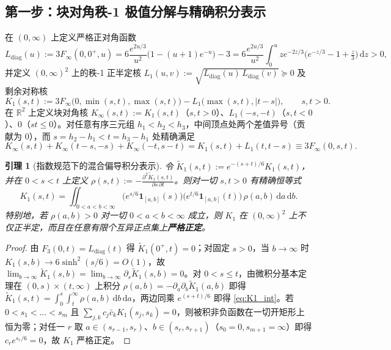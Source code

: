 \documentclass[11pt,a4paper]{article}
\newtheorem{lemma}[theorem]{引理}
\theoremstyle{remark}
\begin{document}
\subsection{第一步：块对角秩-1 极值分解与精确积分表示}

在 $(0,\infty)$ 上定义严格正对角函数
\[
L_{\mathrm{diag}}(u) := 3F_\infty(0, 0^+, u) = 6\frac{e^{2u/3}}{u^2}\big(1 - (u+1)e^{-u}\big) - 3 = 6\frac{e^{2u/3}}{u^2}\int_0^u z e^{-2z/3}\big(e^{-z/3} - 1 + \tfrac{z}{3}\big)\,\mathrm{d}z > 0,
\]
并定义 $(0,\infty)^2$ 上的秩-1 正半定核 $L_1(u,v) := \sqrt{L_{\mathrm{diag}}(u)\,L_{\mathrm{diag}}(v)} \succeq 0$ 及剩余对称核
\[
K_1(s,t) := 3F_\infty\big(0, \min(s,t), \max(s,t)\big) - L_1\big(\max(s,t), |t-s|\big), \qquad s, t > 0.
\]
在 $\mathbb{R}^2$ 上定义块对角核 $K_\infty(s,t) := K_1(s,t)$（$s,t>0$）、$L_1(-s,-t)$（$s,t<0$）、$0$（$st\le 0$）。对任意有序三元组 $h_1 < h_2 < h_3$，中间顶点处两个差值异号（贡献为 $0$），而 $s = h_2-h_1 < t = h_3-h_1$ 处精确满足
\[
K_\infty(s,t) + K_\infty(t-s,-s) + K_\infty(-t,s-t) = K_1(s,t) + L_1(t, t-s) \equiv 3F_\infty(0, s, t).
\]

\begin{lemma}[指数规范下的混合偏导积分表示]\label{lem:rho_int}
令 $\tilde{K}_1(s,t) := e^{-(s+t)/6} K_1(s,t)$，并在 $0 < s < t$ 上定义 $\rho(s,t) := -\frac{\partial^2 \tilde{K}_1(s,t)}{\partial s\,\partial t}$。则对一切 $s, t > 0$ 有精确恒等式
\begin{equation}\label{eq:K1_int}
  K_1(s, t) = \iint_{0 < a < b < \infty} \Big(e^{s/6}\mathbf{1}_{[a,b]}(s)\Big)\Big(e^{t/6}\mathbf{1}_{[a,b]}(t)\Big)\,\rho(a,b)\,\mathrm{d}a\,\mathrm{d}b.
\end{equation}
特别地，若 $\rho(a,b) > 0$ 对一切 $0 < a < b < \infty$ 成立，则 $K_1$ 在 $(0,\infty)^2$ 上不仅正半定，而且在任意有限个互异正点集上\textbf{严格正定}。
\end{lemma}

\begin{proof}
由 $F_3(0, t) = L_{\mathrm{diag}}(t)$ 得 $\tilde{K}_1(0^+, t) = 0$；对固定 $s > 0$，当 $b\to\infty$ 时 $K_1(s, b) \to 6\sinh^2(s/6) = O(1)$，故 $\lim_{b\to\infty}\tilde{K}_1(s,b) = \lim_{b\to\infty}\partial_s\tilde{K}_1(s,b) = 0$。对 $0 < s \le t$，由微积分基本定理在 $(0,s)\times(t,\infty)$ 上积分 $\rho(a,b) = -\partial_a\partial_b\tilde{K}_1(a,b)$ 即得 $\tilde{K}_1(s,t) = \int_0^s \int_t^\infty \rho(a,b)\,\mathrm{d}b\,\mathrm{d}a$，两边同乘 $e^{(s+t)/6}$ 即得 \eqref{eq:K1_int}。若 $0 < s_1 < \dots < s_m$ 且 $\sum_{j,k} c_j \bar{c}_k K_1(s_j, s_k) = 0$，则被积非负函数在一切开矩形上恒为零；对任一 $r$ 取 $a\in(s_{r-1},s_r)$、$b\in(s_r,s_{r+1})$（$s_0=0, s_{m+1}=\infty$）即得 $c_r e^{s_r/6} = 0$，故 $K_1$ 严格正定。
\end{proof}
\end{document}

